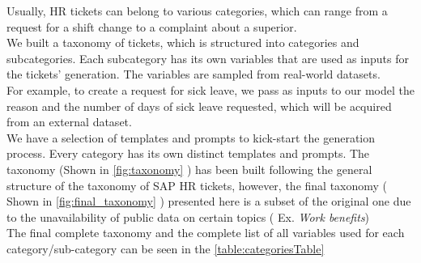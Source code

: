 Usually, HR tickets can belong to various categories, which can range from a request for a shift change to a complaint about a superior. \\
We built a taxonomy of tickets, which is structured into categories and subcategories. Each subcategory has its own variables that are used as inputs for the tickets' generation. The variables are sampled from real-world datasets. \\
For example, to create a request for sick leave, we pass as inputs to our model the reason and the number of days of sick leave requested, which will be acquired from an external dataset. \\
We have a selection of templates and prompts to kick-start the generation process. Every category has its own distinct templates and prompts. The taxonomy (Shown in \autoref{fig:taxonomy} ) has been built following the general structure of the taxonomy of SAP HR tickets, however, the final taxonomy ( Shown in \autoref{fig:final_taxonomy} ) presented here is a subset of the original one due to the unavailability of public data on certain topics ( Ex. \textit{Work benefits}) \\ The final complete taxonomy and the complete list of all variables used for each category/sub-category can be seen in the \autoref{table:categoriesTable}


